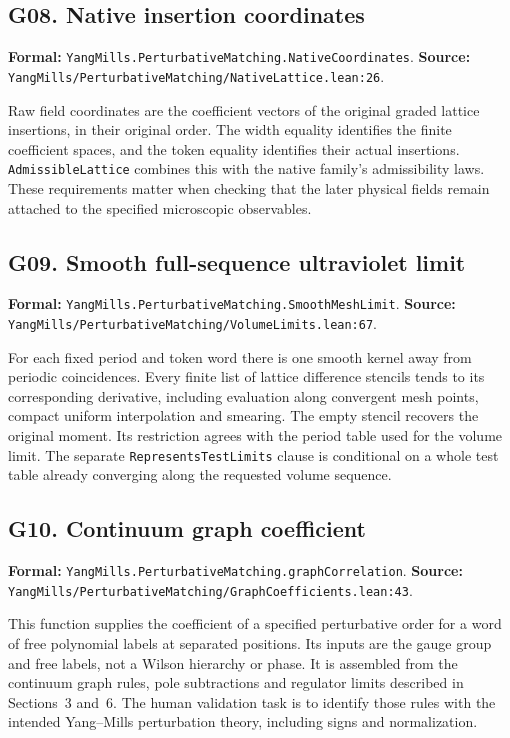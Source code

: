 \documentclass[11pt]{article}
\newcommand{\code}[1]{{\small\nolinkurl{#1}}}
\begin{document}
\subsection*{G08. Native insertion coordinates}
\label{gloss:G08}
\textbf{Formal:} \code{YangMills.PerturbativeMatching.NativeCoordinates}.\newline
\textbf{Source:} \code{YangMills/PerturbativeMatching/NativeLattice.lean:26}.

Raw field coordinates are the coefficient vectors of the original
graded lattice insertions, in their original order. The width equality
identifies the finite coefficient spaces, and the token equality identifies
their actual insertions. \code{AdmissibleLattice} combines this with the
native family's admissibility laws. These requirements matter when
checking that the later physical fields remain attached to the specified
microscopic observables.

\subsection*{G09. Smooth full-sequence ultraviolet limit}
\label{gloss:G09}
\textbf{Formal:} \code{YangMills.PerturbativeMatching.SmoothMeshLimit}.\newline
\textbf{Source:} \code{YangMills/PerturbativeMatching/VolumeLimits.lean:67}.

For each fixed period and token word there is one smooth kernel away
from periodic coincidences. Every finite list of lattice difference
stencils tends to its corresponding derivative, including evaluation
along convergent mesh points, compact uniform interpolation and smearing.
The empty stencil recovers the original moment. Its restriction agrees
with the period table used for the volume limit. The separate
\code{RepresentsTestLimits} clause is conditional on a whole test table
already converging along the requested volume sequence.

\subsection*{G10. Continuum graph coefficient}
\label{gloss:G10}
\textbf{Formal:} \code{YangMills.PerturbativeMatching.graphCorrelation}.\newline
\textbf{Source:} \code{YangMills/PerturbativeMatching/GraphCoefficients.lean:43}.

This function supplies the coefficient of a specified perturbative
order for a word of free polynomial labels at separated positions.
Its inputs are the gauge group and free labels, not a Wilson hierarchy
or phase. It is assembled from the continuum graph rules, pole
subtractions and regulator limits described in Sections~3 and~6.
The human validation task is to identify those rules with the intended
Yang--Mills perturbation theory, including signs and normalization.
\end{document}
